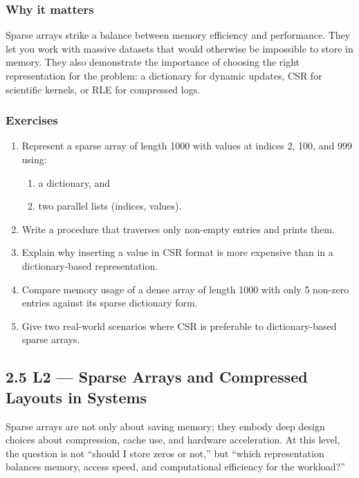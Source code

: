 \documentclass[
  letterpaper,
  DIV=11,
  numbers=noendperiod]{scrreprt}
\providecommand{\tightlist}{%
  \setlength{\itemsep}{0pt}\setlength{\parskip}{0pt}}
\begin{document}
\subsubsection{Why it matters}\label{why-it-matters-25}

Sparse arrays strike a balance between memory efficiency and
performance. They let you work with massive datasets that would
otherwise be impossible to store in memory. They also demonstrate the
importance of choosing the right representation for the problem: a
dictionary for dynamic updates, CSR for scientific kernels, or RLE for
compressed logs.

\subsubsection{Exercises}\label{exercises-25}

\begin{enumerate}
\def\labelenumi{\arabic{enumi}.}
\tightlist
\item
  Represent a sparse array of length 1000 with values at indices 2, 100,
  and 999 using:

  \begin{enumerate}
  \def\labelenumii{\alph{enumii})}
  \tightlist
  \item
    a dictionary, and
  \item
    two parallel lists (indices, values).
  \end{enumerate}
\item
  Write a procedure that traverses only non-empty entries and prints
  them.
\item
  Explain why inserting a value in CSR format is more expensive than in
  a dictionary-based representation.
\item
  Compare memory usage of a dense array of length 1000 with only 5
  non-zero entries against its sparse dictionary form.
\item
  Give two real-world scenarios where CSR is preferable to
  dictionary-based sparse arrays.
\end{enumerate}

\subsection{2.5 L2 --- Sparse Arrays and Compressed Layouts in
Systems}\label{l2-sparse-arrays-and-compressed-layouts-in-systems}

Sparse arrays are not only about saving memory; they embody deep design
choices about compression, cache use, and hardware acceleration. At this
level, the question is not ``should I store zeros or not,'' but ``which
representation balances memory, access speed, and computational
efficiency for the workload?''
\end{document}
